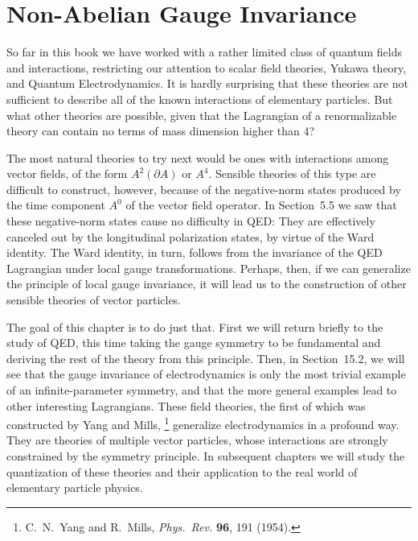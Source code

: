 \chapter{Non-Abelian Gauge Invariance}

So far in this book we have worked with a rather limited class of quantum
fields and interactions, restricting our attention to scalar field theories,
Yukawa theory, and Quantum Electrodynamics.  It is hardly surprising that
these theories are not sufficient to describe all of the known interactions of
elementary particles.  But what other theories are possible, given that the
Lagrangian of a renormalizable theory can contain no terms of mass dimension
higher than 4?

The most natural theories to try next would be ones with interactions among
vector fields, of the form $A^2(\partial A)$ or $A^4$.  Sensible theories of
this type are difficult to construct, however, because of the negative-norm
states produced by the time component $A^0$ of the vector field operator.  In
Section~5.5 we saw that these negative-norm states cause no difficulty in
QED: They are effectively canceled out by the longitudinal polarization
states, by virtue of the Ward identity.  The Ward identity, in turn, follows
from the invariance of the QED Lagrangian under local gauge transformations.
Perhaps, then, if we can generalize the principle of local gauge invariance,
it will lead us to the construction of other sensible theories of vector
particles.

The goal of this chapter is to do just that.  First we will return briefly to
the study of QED, this time taking the gauge symmetry to be fundamental and
deriving the rest of the theory from this principle.  Then, in Section~15.2,
we will see that the gauge invariance of electrodynamics is only the most
trivial example of an infinite-parameter symmetry, and that the more general
examples lead to other interesting Lagrangians.  These field theories, the
first of which was constructed by Yang and Mills,%
\footnote{C.~N.~Yang and R.~Mills, \emph{Phys.\ Rev.} \textbf{96}, 191 (1954).}
generalize electrodynamics in a profound way.  They are theories of multiple
vector particles, whose interactions are strongly constrained by the symmetry
principle.  In subsequent chapters we will study the quantization of these
theories and their application to the real world of elementary particle
physics.

